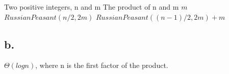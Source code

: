 \documentclass{article}
\begin{document}
\begin{center}
\begin{algorithmic}
\INPUT
Two positive integers, n and m
\OUTPUT
The product of n and m
\State \Return $m$
\State \Return $RussianPeasant(n/2,2m)$
\Else
\State \Return $RussianPeasant((n-1)/2,2m) + m$
\EndIf
\EndFunction
\end{algorithmic}
\end{center}


\subsection*{b.}

$\Theta(logn)$, where n is the first factor of the product.
\end{document}
